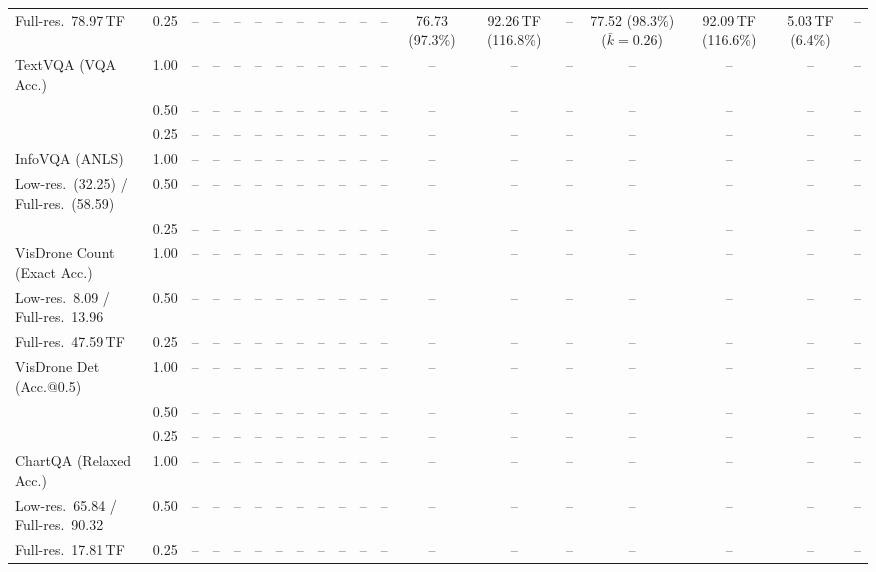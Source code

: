 \begin{table}[t]
{\begin{tabular}{l c | c c c c | c c c c | c c | c c c | c c c c}
{\footnotesize Full-res.\ 78.97\,TF} & 0.25 & -- & -- & -- & -- & -- & -- & -- & -- & -- & -- & 76.73 (97.3\%) & 92.26\,TF (116.8\%) & -- & \cellcolor{gray!15}77.52 (98.3\%) {\footnotesize ($\bar k{=}0.26$)} & 92.09\,TF (116.6\%) & 5.03\,TF (6.4\%) & -- \\
\cmidrule(lr){1-19}
TextVQA (VQA Acc.) & 1.00 & -- & -- & -- & -- & -- & -- & -- & -- & -- & -- & -- & -- & -- & -- & -- & -- & -- \\
 & 0.50 & -- & -- & -- & -- & -- & -- & -- & -- & -- & -- & -- & -- & -- & -- & -- & -- & -- \\
 & 0.25 & -- & -- & -- & -- & -- & -- & -- & -- & -- & -- & -- & -- & -- & -- & -- & -- & -- \\
\cmidrule(lr){1-19}
InfoVQA (ANLS) & 1.00 & -- & -- & -- & -- & -- & -- & -- & -- & -- & -- & -- & -- & -- & -- & -- & -- & -- \\
{\footnotesize Low-res.\ (32.25) / Full-res.\ (58.59)} & 0.50 & -- & -- & -- & -- & -- & -- & -- & -- & -- & -- & -- & -- & -- & -- & -- & -- & -- \\
 & 0.25 & -- & -- & -- & -- & -- & -- & -- & -- & -- & -- & -- & -- & -- & -- & -- & -- & -- \\
\cmidrule(lr){1-19}
VisDrone Count (Exact Acc.) & 1.00 & -- & -- & -- & -- & -- & -- & -- & -- & -- & -- & -- & -- & -- & -- & -- & -- & -- \\
{\footnotesize Low-res.\ 8.09 / Full-res.\ 13.96} & 0.50 & -- & -- & -- & -- & -- & -- & -- & -- & -- & -- & -- & -- & -- & -- & -- & -- & -- \\
{\footnotesize Full-res.\ 47.59\,TF} & 0.25 & -- & -- & -- & -- & -- & -- & -- & -- & -- & -- & -- & -- & -- & -- & -- & -- & -- \\
\cmidrule(lr){1-19}
VisDrone Det (Acc.@0.5) & 1.00 & -- & -- & -- & -- & -- & -- & -- & -- & -- & -- & -- & -- & -- & -- & -- & -- & -- \\
 & 0.50 & -- & -- & -- & -- & -- & -- & -- & -- & -- & -- & -- & -- & -- & -- & -- & -- & -- \\
 & 0.25 & -- & -- & -- & -- & -- & -- & -- & -- & -- & -- & -- & -- & -- & -- & -- & -- & -- \\
\cmidrule(lr){1-19}
ChartQA (Relaxed Acc.) & 1.00 & -- & -- & -- & -- & -- & -- & -- & -- & -- & -- & -- & -- & -- & -- & -- & -- & -- \\
{\footnotesize Low-res.\ 65.84 / Full-res.\ 90.32} & 0.50 & -- & -- & -- & -- & -- & -- & -- & -- & -- & -- & -- & -- & -- & -- & -- & -- & -- \\
{\footnotesize Full-res.\ 17.81\,TF} & 0.25 & -- & -- & -- & -- & -- & -- & -- & -- & -- & -- & -- & -- & -- & -- & -- & -- & -- \\

\end{tabular}}
\end{table}
